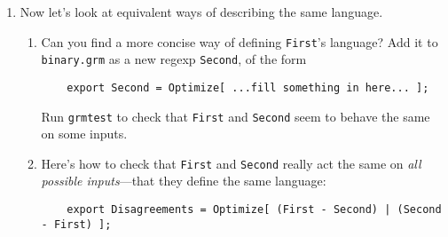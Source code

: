\documentclass[11pt]{article}
\begin{document}
\begin{enumerate}
\begin{enumerate}
\begin{enumerate}
    \item \label{q:fstview}
      Optionally, look at a drawing of First (as an identity
      transducer over the alphabet $\{{\tt 0},{\tt 1}\}$):
	\begin{verbatim}
	$ fstview First.fst
	\end{verbatim}
      Note that \texttt{fstview} is a wrapper script that we are
      providing for you.\footnote{After printing \texttt{fstinfo}, it
        calls \texttt{fstdraw} to produce a logical description of
        the drawing, then makes the drawing using the Graphviz
        package's \texttt{dot} command, and finally displays the
        drawing using {\tt evince}.  Each of these commands has
        many tweakable options.  What if you're running on your
        own machine and don't have {\tt evince}?  Then edit the
        {\tt fstview} script to use a different PDF viewer such as
        {\tt xreader}, {\tt atril}, {\tt xpdf}, or {\tt acroread}.}  The picture
      will take a few seconds to appear if the graphics pixels are
      being sent over a remote X connection.\footnote{If you start
        getting ``can't open display'' errors, then try connecting
        via \texttt{ssh -Y} instead of \texttt{ssh -X}.  An
        alternative is to copy the (small) {\tt .pdf} file to your
        local machine and use your local image viewer. Mac users might also like the free remote file browser Cyberduck.}
    \end{enumerate}

  \item Now let's look at equivalent ways of describing the same language.
    \begin{enumerate}
    \item Can you find a more concise way of defining \texttt{First}'s
      language? Add it to {\tt binary.grm} as a new regexp \texttt{Second}, 
      of the form
	\begin{verbatim}
	export Second = Optimize[ ...fill something in here... ];
	\end{verbatim}

      Run {\tt grmtest} to check that {\tt First} and {\tt Second}
      seem to behave the same on some inputs.

    \item Here's how to check that {\tt First} and {\tt Second}
      really act the same on {\em all possible inputs}---that they
      define the same language:
	\begin{verbatim}
	export Disagreements = Optimize[ (First - Second) | (Second - First) ];
	\end{verbatim}


\end{enumerate}
\end{enumerate}
\end{enumerate}
\end{document}
